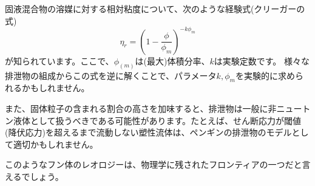 \documentclass[dvipdfmx]{jlreq}
\begin{document}
固液混合物の溶媒に対する相対粘度について、次のような経験式(クリーガーの式)
\[
\eta_r = (1-\frac{\phi}{\phi_{m}})^{-k\phi_{m}} 
\]
が知られています。ここで、$\phi_{(m)}$は(最大)体積分率、$k$は実験定数です。
様々な排泄物の組成からこの式を逆に解くことで、パラメータ$k,\phi_{m}$を実験的に求められるかもしれません。

また、固体粒子の含まれる割合の高さを加味すると、排泄物は一般に非ニュートン液体として扱うべきである可能性があります。たとえば、せん断応力が閾値(降伏応力)を超えるまで流動しない塑性流体は、ペンギンの排泄物のモデルとして適切かもしれません。

このようなフン体のレオロジーは、物理学に残されたフロンティアの一つだと言えるでしょう。
\end{document}
